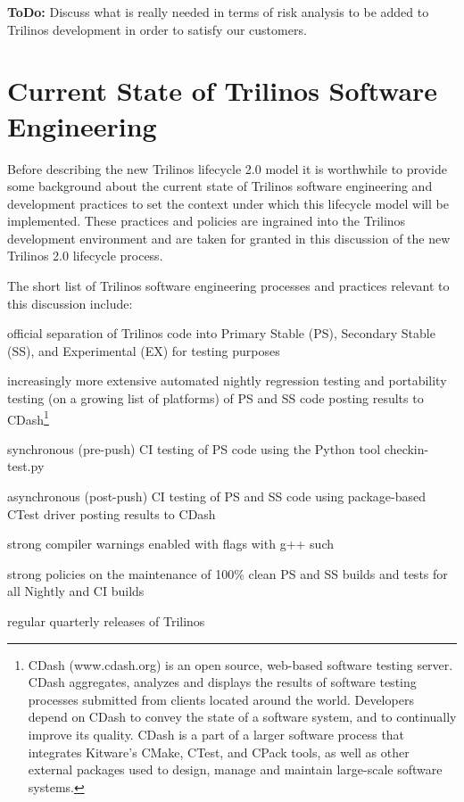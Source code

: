 \documentclass[11pt]{SANDreport}
\begin{document}
{}\textbf{ToDo:} Discuss what is really needed in terms of risk
analysis to be added to Trilinos development in order to satisfy our
customers.


%
{}\section{Current State of Trilinos Software Engineering}
\label{sec:trilinos_current_state}
%

Before describing the new Trilinos lifecycle 2.0 model it is worthwhile
to provide some background about the current state of Trilinos
software engineering and development practices to set the context
under which this lifecycle model will be implemented.  These
practices and policies are ingrained into the Trilinos development
environment and are taken for granted in this discussion of the new
Trilinos 2.0 lifecycle process.

The short list of Trilinos software engineering processes and
practices relevant to this discussion include:
%
\begin{compactitem}
%
{}\item official separation of Trilinos code into Primary
Stable (PS), Secondary Stable (SS), and Experimental (EX) for testing
purposes
%
{}\item increasingly more extensive automated nightly regression
testing and portability testing (on a growing list of platforms) of PS
and SS code posting results to CDash\footnote{CDash (www.cdash.org) is
an open source, web-based software testing server. CDash aggregates,
analyzes and displays the results of software testing processes
submitted from clients located around the world. Developers depend on
CDash to convey the state of a software system, and to continually
improve its quality. CDash is a part of a larger software process that
integrates Kitware's CMake, CTest, and CPack tools, as well as other
external packages used to design, manage and maintain large-scale
software systems.}
%
{}\item synchronous (pre-push) CI testing of PS code using the Python
tool checkin-test.py
%
{}\item asynchronous (post-push) CI testing of PS and SS code using
package-based CTest driver posting results to CDash
%
{}\item strong compiler warnings enabled with flags with g++ such
{}
%
{}\item strong policies on the maintenance of 100\% clean PS and SS
builds and tests for all Nightly and CI builds
%
{}\item regular quarterly releases of Trilinos
%
\end{compactitem}
\end{document}
